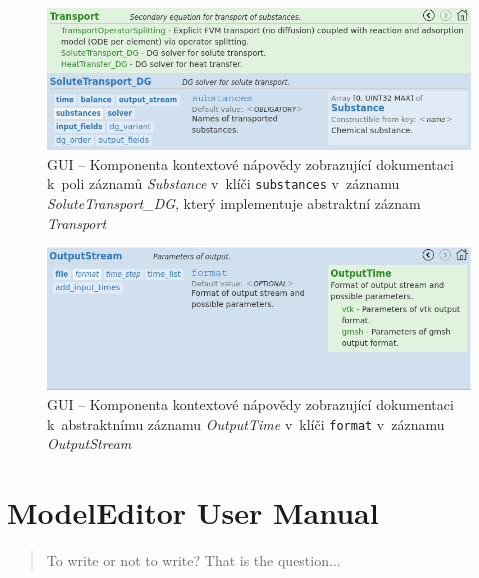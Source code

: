 \documentclass[FM,bw,DP]{tulthesis}
\begin{document}
\begin{figure}[h!]
	\centering
    \includegraphics[width=\textwidth]{../img/screenshots/gui_doc_substances.png}
    \caption[GUI -- Kontextová nápověda pro záznam \textit{SoluteTransport\_DG}]{GUI -- Komponenta kontextové nápovědy zobrazující dokumentaci k~poli záznamů \textit{Substance} v~klíči \texttt{substances} v~záznamu \textit{SoluteTransport\_DG}, který implementuje abstraktní záznam \textit{Transport}}
	\label{img:gui_doc_substances}
\end{figure}

\begin{figure}[h!]
	\centering
    \includegraphics[width=\textwidth]{../img/screenshots/gui_doc_format.png}
    \caption[GUI -- Kontextová nápověda pro záznam \textit{OutputStream}]{GUI -- Komponenta kontextové nápovědy zobrazující dokumentaci k~abstraktnímu záznamu \textit{OutputTime} v~klíči \texttt{format} v~záznamu \textit{OutputStream}}
	\label{img:gui_doc_format}
\end{figure}

\clearpage



\chapter{ModelEditor User Manual}

\begin{quote}
To write or not to write? That is the question...
\end{quote}
\end{document}
